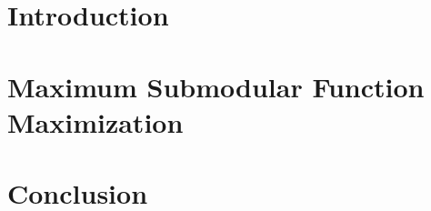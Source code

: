 \newcommand{\defpath}[1]{\def\path{content/#1}}
\newcommand{\add}[1]{}

\chapter{Introduction}
\defpath{introduction}
\add{introduction}

% 
% 

\chapter{Maximum Submodular Function Maximization}
\defpath{knapsack}
\add{knapsack}

\chapter{Conclusion}
\defpath{conclusion}
\add{conclusion}